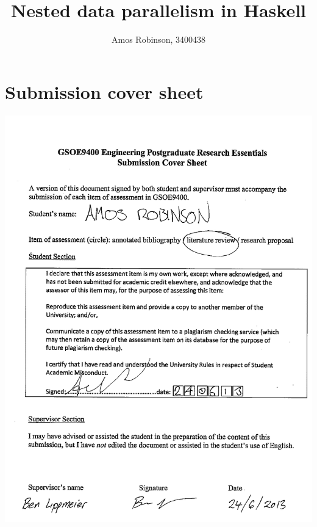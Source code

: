 \documentclass[12pt,a4paper]{article}
\author{Amos Robinson, 3400438}
\title{Nested data parallelism in Haskell}
\begin{document}
\maketitle
\thispagestyle{fancy}


\onehalfspacing
\tableofcontents

\newcommand{\nesl}{{\sc Nesl}\xspace}
\newcommand{\vcode}{{\sc Vcode}\xspace}

\section{Submission cover sheet}
\includegraphics{submissioncoversheet.png}
\end{document}
